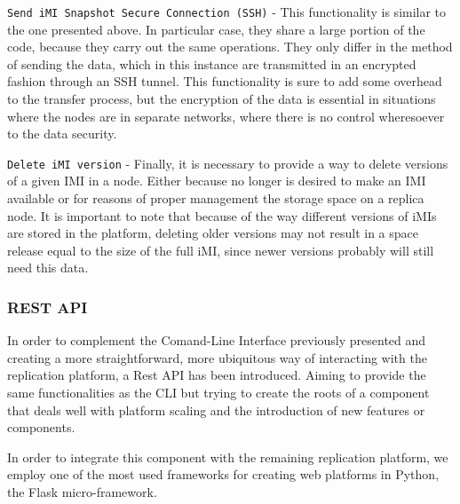 \begin{description}
	\item \texttt{Send iMI Snapshot Secure Connection (SSH)} - This functionality is similar to the one presented above. In particular case, they share a large portion of the code, because they carry out the same operations. They only differ in the method of sending the data, which in this instance are transmitted in an encrypted fashion through an SSH tunnel. This functionality is sure to add some overhead to the transfer process, but the encryption of the data is essential in situations where the nodes are in separate networks, where there is no control wheresoever to the data security.
	\item \texttt{Delete iMI version} - Finally, it is necessary to provide a way to delete versions of a given IMI in a node. Either because no longer is desired to make an IMI available or for reasons of proper management the storage space on a replica node. It is important to note that because of the way different versions of iMIs are stored in the platform, deleting older versions may not result in a space release equal to the size of the full iMI, since newer versions probably will still need this data.
\end{description}


\subsubsection{REST API}
\label{subsub:impl_icbdrep_restapi}

In order to complement the Comand-Line Interface previously presented and creating a more straightforward, more ubiquitous way of interacting with the replication platform, a Rest API has been introduced. Aiming to provide the same functionalities as the CLI but trying to create the roots of a component that deals well with platform scaling and the introduction of new features or components.

In order to integrate this component with the remaining replication platform, we employ one of the most used frameworks for creating web platforms in Python, the Flask micro-framework.

